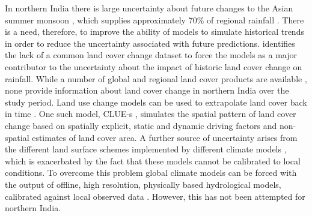 \documentclass{icldt}\usepackage[]{graphicx}\usepackage[]{color}
\begin{document}
In northern India there is large uncertainty about future changes to the Asian summer monsoon \citep{Goswami2006,Turner2009}, which supplies approximately 70\% of regional rainfall \citep{Thenkabail2005}. There is a need, therefore, to improve the ability of models to simulate historical trends in order to reduce the uncertainty associated with future predictions. \citet{Pitman2009} identifies the lack of a common land cover change dataset to force the models as a major contributor to the uncertainty about the impact of historic land cover change on rainfall. While a number of global and regional land cover products are available \citep[e.g.][]{Hansen2000,Loveland2000,Friedl2002}, none provide information about land cover change in northern India over the study period. Land use change models can be used to extrapolate land cover back in time \citep{Verburg2002}. One such model, CLUE-s \citep{Verburg2002,Verburg2004}, simulates the spatial pattern of land cover change based on spatially explicit, static and dynamic driving factors and non-spatial estimates of land cover area. A further source of uncertainty arises from the different land surface schemes implemented by different climate models \citep{Henderson1996,Pitman2009}, which is exacerbated by the fact that these models cannot be calibrated to local conditions. To overcome this problem global climate models can be forced with the output of offline, high resolution, physically based hydrological models, calibrated against local observed data \citep{Seneviratne2010}. However, this has not been attempted for northern India. \\


\end{document}
